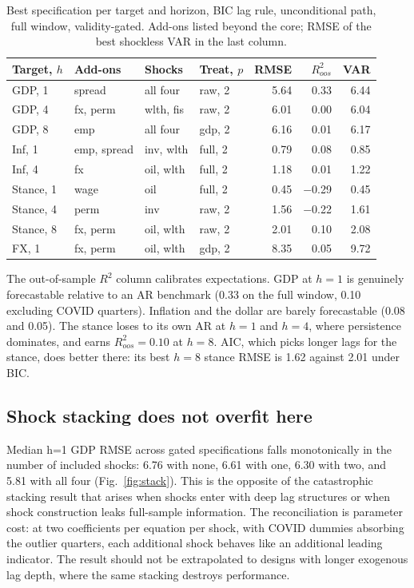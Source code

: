 \documentclass[conference]{IEEEtran}
\begin{document}
\begin{table}[t]
\caption{Best specification per target and horizon, BIC lag rule, unconditional path, full window, validity-gated. Add-ons listed beyond the core; RMSE of the best shockless VAR in the last column.}
\label{tab:leader}
\centering
\small
\setlength{\tabcolsep}{3.5pt}
\begin{tabular}{@{}llllrrr@{}}
\toprule
Target, $h$ & Add-ons & Shocks & Treat, $p$ & RMSE & $R^2_{oos}$ & VAR \\
\midrule
GDP, 1 & spread & all four & raw, 2 & 5.64 & 0.33 & 6.44 \\
GDP, 4 & fx, perm & wlth, fis & raw, 2 & 6.01 & 0.00 & 6.04 \\
GDP, 8 & emp & all four & gdp, 2 & 6.16 & 0.01 & 6.17 \\
Inf, 1 & emp, spread & inv, wlth & full, 2 & 0.79 & 0.08 & 0.85 \\
Inf, 4 & fx & oil, wlth & full, 2 & 1.18 & 0.01 & 1.22 \\
Stance, 1 & wage & oil & full, 2 & 0.45 & $-$0.29 & 0.45 \\
Stance, 4 & perm & inv & raw, 2 & 1.56 & $-$0.22 & 1.61 \\
Stance, 8 & fx, perm & oil, wlth & raw, 2 & 2.01 & 0.10 & 2.08 \\
FX, 1 & fx, perm & oil, wlth & gdp, 2 & 8.35 & 0.05 & 9.72 \\
\bottomrule
\end{tabular}
\end{table}

The out-of-sample $R^2$ column calibrates expectations. GDP at $h=1$ is genuinely forecastable relative to an AR benchmark (0.33 on the full window, 0.10 excluding COVID quarters). Inflation and the dollar are barely forecastable (0.08 and 0.05). The stance loses to its own AR at $h=1$ and $h=4$, where persistence dominates, and earns $R^2_{oos}=0.10$ at $h=8$. AIC, which picks longer lags for the stance, does better there: its best $h=8$ stance RMSE is 1.62 against 2.01 under BIC.

\subsection{Shock stacking does not overfit here}
Median h=1 GDP RMSE across gated specifications falls monotonically in the number of included shocks: 6.76 with none, 6.61 with one, 6.30 with two, and 5.81 with all four (Fig.~\ref{fig:stack}). This is the opposite of the catastrophic stacking result that arises when shocks enter with deep lag structures or when shock construction leaks full-sample information. The reconciliation is parameter cost: at two coefficients per equation per shock, with COVID dummies absorbing the outlier quarters, each additional shock behaves like an additional leading indicator. The result should not be extrapolated to designs with longer exogenous lag depth, where the same stacking destroys performance.
\end{document}
